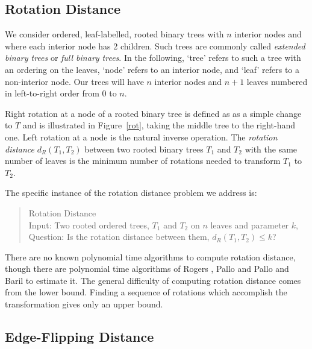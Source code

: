 \documentclass[12pt]{article}
\begin{document}
\subsection*{Rotation Distance}


We consider ordered, leaf-labelled, rooted binary trees with $n$ interior nodes and
where each interior node has 2 children.  Such trees are
commonly called {\em extended binary trees} \cite{knuth3} or  {\em full binary trees}.
In the following, `tree' refers to such a tree with an ordering on the leaves, `node' refers
to an interior node, and `leaf' refers to a non-interior node.
Our trees will have $n$ interior nodes and  $n+1$ leaves numbered in left-to-right order
from 0 to $n$.

Right rotation at a node of a rooted binary tree is defined as as a simple change to
$T$ and is illustrated in
Figure~\ref{rot}, taking the middle tree to the right-hand one. Left rotation at a node is
the natural inverse operation.
The
{\em rotation distance}
$d_R(T_1,T_2)$ between two rooted binary trees
$T_1$ and
$T_2$ with the same number of leaves is the minimum number of rotations
needed to transform $T_1$ to $T_2$.

The specific instance of the rotation distance problem we address is:
\begin{quote}
{\sc Rotation Distance}\\
{\sc Input:} Two rooted ordered trees, $T_1$ and $T_2$ on 
$n$ leaves and parameter $k$,\\
{\sc Question:} Is the rotation distance between them, $d_R(T_1,T_2) \leq k$?
\end{quote}

There are no known polynomial time algorithms to compute rotation distance, though there are polynomial time algorithms of Rogers \cite{rogers}, Pallo\cite{pallo} and Pallo and Baril \cite{barilpallo} to estimate it.
The general difficulty of computing rotation distance comes from the lower bound.  Finding a sequence of rotations which accomplish the transformation gives only an upper bound.    

\subsection*{Edge-Flipping Distance}
\end{document}
